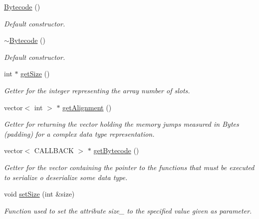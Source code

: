\begin{DoxyCompactItemize}
\item 
\hyperlink{class_dynamic_fast_buffers_1_1_bytecode_ac06d0fcda7b517da81e2c4c600c0de8c}{Bytecode} ()
\begin{DoxyCompactList}\small\item\em Default constructor. \end{DoxyCompactList}\item 
\hypertarget{class_dynamic_fast_buffers_1_1_bytecode_a6e753b79649428e5dbd5033676fce963}{\hyperlink{class_dynamic_fast_buffers_1_1_bytecode_a6e753b79649428e5dbd5033676fce963}{$\sim$\-Bytecode} ()}\label{class_dynamic_fast_buffers_1_1_bytecode_a6e753b79649428e5dbd5033676fce963}

\begin{DoxyCompactList}\small\item\em Default constructor. \end{DoxyCompactList}\item 
int $\ast$ \hyperlink{class_dynamic_fast_buffers_1_1_bytecode_a7643a6a540efd276138fc5ac85640411}{get\-Size} ()
\begin{DoxyCompactList}\small\item\em Getter for the integer representing the array number of slots. \end{DoxyCompactList}\item 
vector$<$ int $>$ $\ast$ \hyperlink{class_dynamic_fast_buffers_1_1_bytecode_a695e82e8a2c9aeca47f023f542ef0486}{get\-Alignment} ()
\begin{DoxyCompactList}\small\item\em Getter for returning the vector holding the memory jumps measured in Bytes (padding) for a complex data type representation. \end{DoxyCompactList}\item 
vector$<$ C\-A\-L\-L\-B\-A\-C\-K $>$ $\ast$ \hyperlink{class_dynamic_fast_buffers_1_1_bytecode_a24976cbe386c4309d86e1950ebea7904}{get\-Bytecode} ()
\begin{DoxyCompactList}\small\item\em Getter for the vector containing the pointer to the functions that must be executed to serialize o deserialize some data type. \end{DoxyCompactList}\item 
void \hyperlink{class_dynamic_fast_buffers_1_1_bytecode_a3bb8c6bf599c5b2adc6147cd2f8a75b2}{set\-Size} (int \&size)
\begin{DoxyCompactList}\small\item\em Function used to set the attribute size\-\_\- to the specified value given as parameter. \end{DoxyCompactList}\item 

\end{DoxyCompactItemize}
